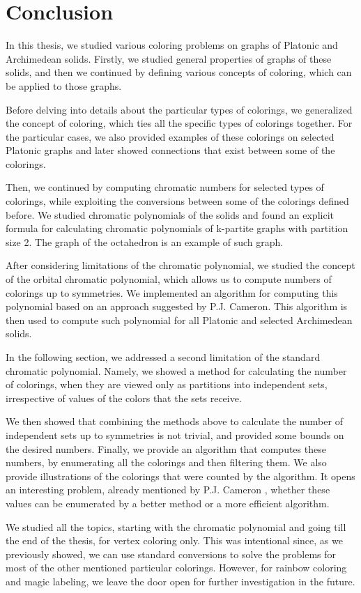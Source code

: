\chapter*{Conclusion}

In this thesis, we studied various coloring problems on graphs of Platonic and Archimedean solids. Firstly, we studied general properties of graphs of these solids, and then we continued by defining various concepts of coloring, which can be applied to those graphs.

Before delving into details about the particular types of colorings, we generalized the concept of coloring, which ties all the specific types of colorings together. For the particular cases, we also provided examples of these colorings on selected Platonic graphs and later showed connections that exist between some of the colorings.

Then, we continued by computing chromatic numbers for selected types of colorings, while exploiting the conversions between some of the colorings defined before. We studied chromatic polynomials of the solids and found an explicit formula for calculating chromatic polynomials of k-partite graphs with partition size 2. The graph of the octahedron is an example of such graph.

After considering limitations of the chromatic polynomial, we studied the concept of the orbital chromatic polynomial, which allows us to compute numbers of colorings up to symmetries. We implemented an algorithm for computing this polynomial based on an approach suggested by P.J. Cameron. This algorithm is then used to compute such polynomial for all Platonic and selected Archimedean solids.

In the following section, we addressed a second limitation of the standard chromatic polynomial. Namely, we showed a method for calculating the number of colorings, when they are viewed only as partitions into independent sets, irrespective of values of the colors that the sets receive.

We then showed that combining the methods above to calculate the number of independent sets up to symmetries is not trivial, and provided some bounds on the desired numbers. Finally, we provide an algorithm that computes these numbers, by enumerating all the colorings and then filtering them. We also provide illustrations of the colorings that were counted by the algorithm. It opens an interesting problem, already mentioned by P.J. Cameron \cite{cameron-countcols}, whether these values can be enumerated by a better method or a more efficient algorithm.

We studied all the topics, starting with the chromatic polynomial and going till the end of the thesis, for vertex coloring only. This was intentional since, as we previously showed, we can use standard conversions to solve the problems for most of the other mentioned particular colorings. However, for rainbow coloring and magic labeling, we leave the door open for further investigation in the future.